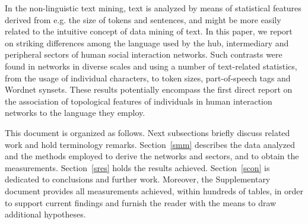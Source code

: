 \documentclass[review]{elsarticle}
\begin{document}
In the non-linguistic text mining, text is analyzed by means of statistical features
derived from e.g. the size of tokens and sentences,
and might be more easily related to the intuitive concept of data mining of text.
In this paper, we report on striking differences among the language used by the hub, intermediary and peripheral sectors of
human social interaction networks.
Such contrasts were found in networks in diverse scales and using a number of text-related statistics,
from the usage of individual characters, to token sizes, part-of-speech tags and Wordnet synsets.
These results potentially encompass the first direct report on the association of topological features
of individuals in human interaction networks to the language they employ.

This document is organized as follows.
Next subsections briefly discuss related work and hold terminology remarks.
Section~\ref{smm} describes the data analyzed and the methods employed to
derive the networks and sectors, and to obtain the measurements.
Section~\ref{sres} holds the results achieved.
Section~\ref{scon} is dedicated to conclusions and further work.
Moreover, the Supplementary document provides all measurements achieved,
within hundreds of tables, in order to support current findings and furnish
the reader with the means to draw additional hypotheses.
\end{document}
